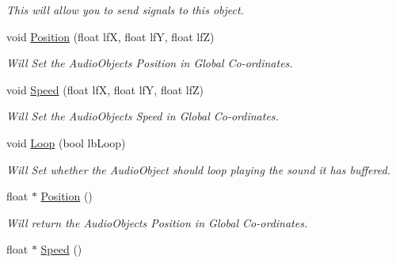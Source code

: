 \begin{DoxyCompactItemize}
\begin{DoxyCompactList}\small\item\em This will allow you to send signals to this object. \end{DoxyCompactList}\item 
\hypertarget{classc_audio_object_a51d6f6bd4d8edc94e6208c712fdafcab}{
void \hyperlink{classc_audio_object_a51d6f6bd4d8edc94e6208c712fdafcab}{Position} (float lfX, float lfY, float lfZ)}
\label{classc_audio_object_a51d6f6bd4d8edc94e6208c712fdafcab}

\begin{DoxyCompactList}\small\item\em Will Set the AudioObjects Position in Global Co-\/ordinates. \end{DoxyCompactList}\item 
\hypertarget{classc_audio_object_aa2c055a6371660e1f8f55593a3631c4d}{
void \hyperlink{classc_audio_object_aa2c055a6371660e1f8f55593a3631c4d}{Speed} (float lfX, float lfY, float lfZ)}
\label{classc_audio_object_aa2c055a6371660e1f8f55593a3631c4d}

\begin{DoxyCompactList}\small\item\em Will Set the AudioObjects Speed in Global Co-\/ordinates. \end{DoxyCompactList}\item 
\hypertarget{classc_audio_object_ae76c7e952f7eabc5fc7ce95eccbbb0b2}{
void \hyperlink{classc_audio_object_ae76c7e952f7eabc5fc7ce95eccbbb0b2}{Loop} (bool lbLoop)}
\label{classc_audio_object_ae76c7e952f7eabc5fc7ce95eccbbb0b2}

\begin{DoxyCompactList}\small\item\em Will Set whether the AudioObject should loop playing the sound it has buffered. \end{DoxyCompactList}\item 
\hypertarget{classc_audio_object_a55488d9c5d818637de6f09aeda27b6c1}{
float $\ast$ \hyperlink{classc_audio_object_a55488d9c5d818637de6f09aeda27b6c1}{Position} ()}
\label{classc_audio_object_a55488d9c5d818637de6f09aeda27b6c1}

\begin{DoxyCompactList}\small\item\em Will return the AudioObjects Position in Global Co-\/ordinates. \end{DoxyCompactList}\item 
\hypertarget{classc_audio_object_acde57e13d2864cd8d2ae87899a13520d}{
float $\ast$ \hyperlink{classc_audio_object_acde57e13d2864cd8d2ae87899a13520d}{Speed} ()}
\label{classc_audio_object_acde57e13d2864cd8d2ae87899a13520d}


\end{DoxyCompactItemize}
